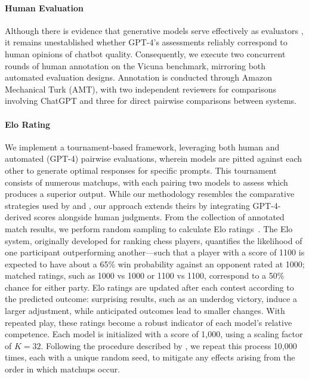 \paragraph{Human Evaluation} Although there is evidence that generative models serve effectively as evaluators \citep{fu2023gptscore}, it remains unestablished whether GPT-4’s assessments reliably correspond to human opinions of chatbot quality. Consequently, we execute two concurrent rounds of human annotation on the Vicuna benchmark, mirroring both automated evaluation designs. Annotation is conducted through Amazon Mechanical Turk (AMT), with two independent reviewers for comparisons involving ChatGPT and three for direct pairwise comparisons between systems.

\paragraph{Elo Rating} We implement a tournament-based framework, leveraging both human and automated (GPT-4) pairwise evaluations, wherein models are pitted against each other to generate optimal responses for specific prompts. This tournament consists of numerous matchups, with each pairing two models to assess which produces a superior output. While our methodology resembles the comparative strategies used by \citet{bai2022training} and \citet{vicuna2023}, our approach extends theirs by integrating GPT-4-derived scores alongside human judgments. From the collection of annotated match results, we perform random sampling to calculate Elo ratings~\citep{elo1967proposed,elo1978rating}. The Elo system, originally developed for ranking chess players, quantifies the likelihood of one participant outperforming another—such that a player with a score of 1100 is expected to have about a 65\% win probability against an opponent rated at 1000; matched ratings, such as 1000 vs 1000 or 1100 vs 1100, correspond to a 50\% chance for either party. Elo ratings are updated after each contest according to the predicted outcome: surprising results, such as an underdog victory, induce a larger adjustment, while anticipated outcomes lead to smaller changes. With repeated play, these ratings become a robust indicator of each model's relative competence. Each model is initialized with a score of 1,000, using a scaling factor of $K=32$. Following the procedure described by \citet{vicuna2023}, we repeat this process 10,000 times, each with a unique random seed, to mitigate any effects arising from the order in which matchups occur.

